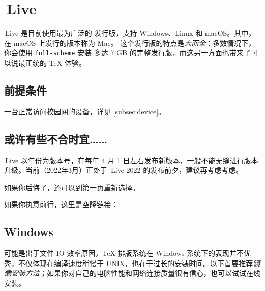 \section{\,Live}
\label{sec:tl}

\,Live 是目前使用最为广泛的  发行版，支持 Windows、Linux 和 macOS。其中，在 macOS 上发行的版本称为 Mac。
这个发行版的特点是\emph{大而全}：多数情况下，你会使用 \texttt{full-scheme} 安装 多达 7 GB 的完整发行版，而这另一方面也带来了可以说最正统的 \TeX{} 体验。

\subsection{前提条件}

一台正常访问校园网的设备，详见 \ref{subsec:device}。

\subsection{或许有些不合时宜……}

\,Live 以年份为版本号，在每年 4 月 1 日左右发布新版本，一般不能无缝进行版本升级。当前（2022年3月）正处于 \,Live 2022 的发布前夕，建议再考虑考虑。

如果你后悔了，还可以到第一页重新选择。

如果你执意前行，这里是空降链接：
\hyperref[subsec:tl-win]{\faWindows{}}\,
\hyperref[subsec:tl-linux]{\faLinux{}}\,
\hyperref[subsec:tl-mac]{\faApple{}}

\subsection{Windows}
\label{subsec:tl-win}

\begin{widepar}
可能是出于文件 IO 效率原因，\TeX{} 排版系统在 Windows 系统下的表现并不优秀，不仅体现在编译速度稍慢于 UNIX，也在于过长的安装时间。以下首要推荐\emph{镜像安装方法}；如果你对自己的电脑性能和网络连接质量很有信心，也可以试试在线安装。
\end{widepar}

